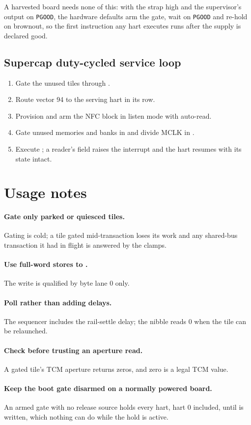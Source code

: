 A harvested board needs none of this: with the strap high and the supervisor's output on \texttt{PGOOD}, the hardware defaults arm the gate, wait on \texttt{PGOOD} and re-hold on brownout, so the first instruction any hart executes runs after the supply is declared good.

\subsection{Supercap duty-cycled service loop}

\begin{enumerate}
	\item Gate the unused tiles through .
	\item Route  vector 94 to the serving hart in its  row.
	\item Provision and arm the NFC block in listen mode with auto-read.
	\item Gate unused memories and banks in  and divide MCLK in .
	\item Execute ; a reader's field raises the interrupt and the hart resumes with its state intact.
\end{enumerate}

\section{Usage notes}

\paragraph{Gate only parked or quiesced tiles.} Gating is cold; a tile gated mid-transaction loses its work and any shared-bus transaction it had in flight is answered by the clamps.

\paragraph{Use full-word stores to .} The write is qualified by byte lane 0 only.

\paragraph{Poll  rather than adding delays.} The sequencer includes the rail-settle delay; the nibble reads 0 when the tile can be relaunched.

\paragraph{Check  before trusting an aperture read.} A gated tile's TCM aperture returns zeros, and zero is a legal TCM value.

\paragraph{Keep the boot gate disarmed on a normally powered board.} An armed gate with no release source holds every hart, hart 0 included, until  is written, which nothing can do while the hold is active.
